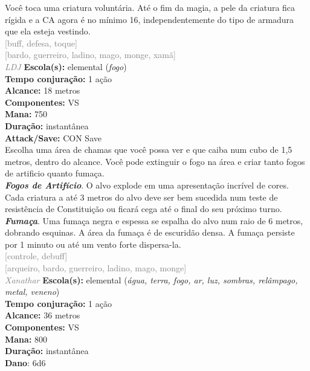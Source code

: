 \documentclass{RPG_Adventure}[2021/10/20]
\begin{document}
{\normalsize Você toca uma criatura voluntária. Até o fim da magia, a pele da criatura fica rígida e a CA agora é no mínimo 16, independentemente do tipo de armadura que ela esteja vestindo.\\}
{\scriptsize \textcolor{gray}{[buff, defesa, toque]\\}}
{\scriptsize \textcolor{gray}{[bardo, guerreiro, ladino, mago, monge, xamã]\\}}
{\tiny \textcolor{gray}{\textit{LDJ}}}\jump{}
{\small \t \textbf{Escola(s):} elemental (\textit{fogo})\\\t \textbf{Tempo conjuração:} 1 ação\\\t \textbf{Alcance:} 18 metros\\\t \textbf{Componentes:} VS\\\t \textbf{Mana:} 750\\\t \textbf{Duração:} instantânea\\\t \textbf{Attack/Save:} CON Save\\}
{\normalsize Escolha uma área de chamas que você possa ver e que caiba num cubo de 1,5 metros, dentro do alcance. Você pode extinguir o fogo na área e criar tanto fogos de artificio quanto fumaça.\\\t \textbf{\textit{Fogos de Artifício}}. O alvo explode em uma apresentação incrível de cores. Cada criatura a até 3 metros do alvo deve ser bem sucedida num teste de resistência de Constituição ou ficará cega até o final do seu próximo turno.\\\t \textbf{\textit{Fumaça}}. Uma fumaça negra e espessa se espalha do alvo num raio de 6 metros, dobrando esquinas. A área da fumaça é de escuridão densa.  A fumaça persiste por 1 minuto ou até um vento forte dispersa-la.\\}
{\scriptsize \textcolor{gray}{[controle, debuff]\\}}
{\scriptsize \textcolor{gray}{[arqueiro, bardo, guerreiro, ladino, mago, monge]\\}}
{\tiny \textcolor{gray}{\textit{Xanathar}}}\jump{}
{\small \t \textbf{Escola(s):} elemental (\textit{água, terra, fogo, ar, luz, sombras, relâmpago, metal, veneno})\\\t \textbf{Tempo conjuração:} 1 ação\\\t \textbf{Alcance:} 36 metros\\\t \textbf{Componentes:} VS\\\t \textbf{Mana:} 800\\\t \textbf{Duração:} instantânea\\\t \textbf{Dano}: 6d6\\}
\end{document}
